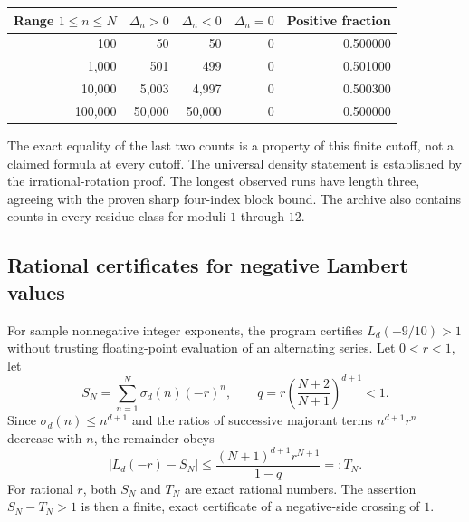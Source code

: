 \documentclass[11pt,letterpaper]{article}
\theoremstyle{definition}
\newcommand{\Delt}{\Delta}
\newcommand{\sig}{\sigma}
\numberwithin{equation}{section}
\begin{document}
\begin{center}
\begin{tabular}{rrrrr}
\toprule
Range $1\le n\le N$ & $\Delt_n>0$ & $\Delt_n<0$ & $\Delt_n=0$ & Positive fraction\\
\midrule
100&50&50&0&0.500000\\
1,000&501&499&0&0.501000\\
10,000&5,003&4,997&0&0.500300\\
100,000&50,000&50,000&0&0.500000\\
\bottomrule
\end{tabular}
\end{center}
The exact equality of the last two counts is a property of this finite
cutoff, not a claimed formula at every cutoff. The universal density
statement is established by the irrational-rotation proof.
The longest observed runs have length three, agreeing with the proven
sharp four-index block bound. The archive also contains counts in every
residue class for moduli $1$ through $12$.

\subsection{Rational certificates for negative Lambert values}

For sample nonnegative integer exponents, the program certifies
$L_d(-9/10)>1$ without trusting floating-point evaluation of an alternating
series. Let $0<r<1$, let
\[
S_N=\sum_{n=1}^N\sig_d(n)(-r)^n,
\qquad q=r\left(\frac{N+2}{N+1}\right)^{d+1}<1.
\]
Since $\sig_d(n)\le n^{d+1}$ and the ratios of successive majorant terms
$n^{d+1}r^n$ decrease with $n$, the remainder obeys
\begin{equation}\label{eq:tail-certificate}
|L_d(-r)-S_N|
\le\frac{(N+1)^{d+1}r^{N+1}}{1-q}=:T_N.
\end{equation}
For rational $r$, both $S_N$ and $T_N$ are exact rational numbers.
The assertion $S_N-T_N>1$ is then a finite, exact certificate of a
negative-side crossing of $1$.
\end{document}
